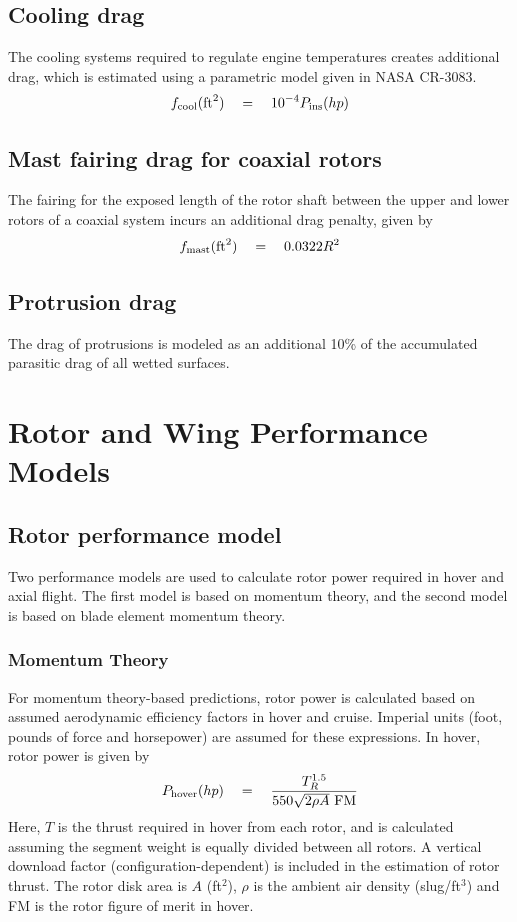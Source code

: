 \subsection{Cooling drag}
The cooling systems required to regulate engine temperatures creates additional drag, which is estimated using a parametric model given in NASA CR-3083.
\begin{equation}
f_{\rm cool} ({\rm ft}^2)\quad = \quad 10^{-4} P_{\rm ins} (hp)
\end{equation}

\subsection{Mast fairing drag for coaxial rotors}
The fairing for the exposed length of the rotor shaft between the upper and lower rotors of a coaxial system incurs an additional drag penalty, given by 
\begin{equation}
f_{\rm mast} ({\rm ft}^2)\quad = \quad 0.0322 R^2
\end{equation}

\subsection{Protrusion drag}
The drag of protrusions is modeled as an additional 10\% of the accumulated parasitic drag of all wetted surfaces.

\section{Rotor and Wing Performance Models}

\subsection{Rotor performance model}

Two performance models are used to calculate rotor power required in hover and axial flight. The first model is based on momentum theory, and the second model is based on blade element momentum theory. 

\subsubsection{Momentum Theory}
For momentum theory-based predictions, rotor power is calculated based on assumed aerodynamic efficiency factors in hover and cruise. Imperial units (foot, pounds of force and horsepower) are assumed for these expressions. In hover, rotor power is given by 
\begin{equation}
P_{\rm hover} (hp) \quad = \quad \frac{T_R^{1.5}}{550 \sqrt{2 \rho A} \textrm{ FM}}
\end{equation}
Here, $T$ is the thrust required in hover from each rotor, and is calculated assuming the segment weight is equally divided between all rotors. A vertical download factor (configuration-dependent) is included in the estimation of rotor thrust. The rotor disk area is $A$ (ft$^2$), $\rho$ is the ambient air density (slug/ft$^3$) and FM is the rotor figure of merit in hover. 

